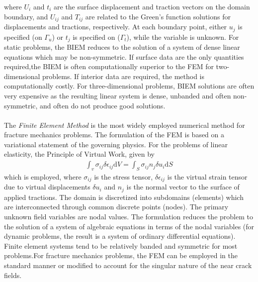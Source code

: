 \documentclass[12pt]{article}
\begin{document}
where $U_i$ and $t_i$ are the surface displacement and traction vectors on the domain boundary, and
$U_{ij}$ and $T_{ij}$ are related to the Green's function solutions for displacements and tractions,
respectively. At each boundary point, either $u_j$ is specified (on $\varGamma_u$) or $t_j$ is specified on ($\varGamma_t$), while
the variable is unknown.
For static problems, the BIEM
reduces to the solution of a system of dense linear equations which may be non-symmetric. If
surface data are the only quantities required,the BIEM is often
computationally superior to the FEM for two-dimensional problems. If interior data are required,
the method is computationally costly. For three-dimensional problems, BIEM solutions are often
very expensive as the resulting linear system is dense, unbanded and often non-symmetric, and often
do not produce good solutions.
\\\\
The \textit{Finite Element Method} is the most widely employed numerical method for fracture mechanics problems.
The formulation of the FEM is based on a variational statement of the governing physics. For the
problems of linear elasticity, the Principle of Virtual Work, given by
\begin{align*}
    \int_{v}\sigma_{ij} \delta \epsilon_{ij} \text{d} V = \int_S \sigma_{ij} n_j \delta u_i \text{d} S \tag{14} \label{14}
\end{align*}
which is employed, where $\sigma_{ij}$ is the stress tensor, $\delta \epsilon_{ij}$ is the virtual strain tensor due to virtual displacements
$\delta u_i$ and $n_j$
is the normal vector to the surface of applied tractions. The domain is discretized into
subdomains (elements) which are interconnected through common discrete points (nodes). The
primary unknown field variables are nodal values. The formulation reduces the problem to the
solution of a system of algebraic equations in terms of the nodal variables (for dynamic problems,
the result is a system of ordinary differential equations). Finite element systems tend to be relatively
banded and symmetric for most problems.For fracture mechanics problems, the FEM can be employed in the standard manner or
modified to account for the singular nature of the near crack fields.
\end{document}
